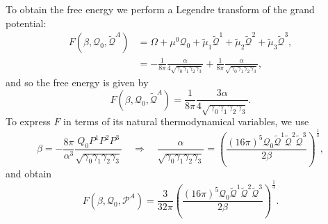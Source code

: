 To obtain the free energy we perform a Legendre transform of the grand potential:
\begin{equation*}
    \begin{aligned}
        F(\beta, \mathcal{Q}_0, \tilde{\mathcal{Q}}^A) &= \Omega + \mu^0 \mathcal{Q}_0 + \tilde{\mu}_1 \tilde{\mathcal{Q}}^1 + \tilde{\mu}_2 \tilde{\mathcal{Q}}^2 + \tilde{\mu}_3 \tilde{\mathcal{Q}}^3, \\
        &= -\frac{1}{8\pi} \frac{\alpha}{4\sqrt{\gamma_0 \gamma_1 \gamma_2 \gamma_3}} + \frac{1}{8\pi} \frac{\alpha}{\sqrt{\gamma_0 \gamma_1 \gamma_2 \gamma_3}}, 
    \end{aligned}
\end{equation*}
and so the free energy is given by
\begin{equation}
    F(\beta, \mathcal{Q}_0, \tilde{\mathcal{Q}}^A) = \frac{1}{8\pi} \frac{3\alpha}{4\sqrt{\gamma_0 \gamma_1 \gamma_2 \gamma_3}}.
\end{equation}
To express $F$ in terms of its natural thermodynamical variables, we use
\begin{equation*}
    \beta = -\frac{8\pi}{\alpha^3}\frac{Q_0P^1P^2P^3}{\sqrt{\gamma_0 \gamma_1 \gamma_2 \gamma_3}} \quad \Rightarrow \quad \frac{\alpha}{\sqrt{\gamma_0 \gamma_1 \gamma_2 \gamma_3}} = \left(\frac{(16\pi)^5\mathcal{Q}_0 \tilde{\mathcal{Q}}^1 \tilde{\mathcal{Q}}^2 \tilde{\mathcal{Q}}^3}{2\beta}\right)^{\frac{1}{3}},
\end{equation*}
and obtain
\begin{equation}
    F(\beta, \mathcal{Q}_0, \mathcal{P}^A) = \frac{3}{32\pi}\left(\frac{(16\pi)^5\mathcal{Q}_0 \tilde{\mathcal{Q}}^1 \tilde{\mathcal{Q}}^2 \tilde{\mathcal{Q}}^3}{2\beta}\right)^{\frac{1}{3}}.
\end{equation}

